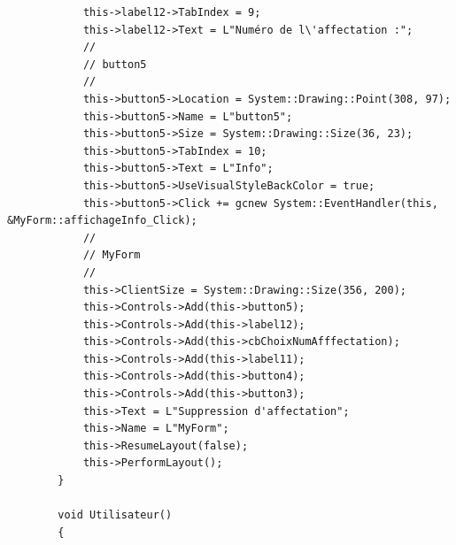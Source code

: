 \documentclass[main.tex]{subfiles}
\begin{document}
\begin{lstlisting}
			this->label12->TabIndex = 9;
			this->label12->Text = L"Numéro de l\'affectation :";
			// 
			// button5
			// 
			this->button5->Location = System::Drawing::Point(308, 97);
			this->button5->Name = L"button5";
			this->button5->Size = System::Drawing::Size(36, 23);
			this->button5->TabIndex = 10;
			this->button5->Text = L"Info";
			this->button5->UseVisualStyleBackColor = true;
			this->button5->Click += gcnew System::EventHandler(this, &MyForm::affichageInfo_Click);
			// 
			// MyForm
			// 
			this->ClientSize = System::Drawing::Size(356, 200);
			this->Controls->Add(this->button5);
			this->Controls->Add(this->label12);
			this->Controls->Add(this->cbChoixNumAfffectation);
			this->Controls->Add(this->label11);
			this->Controls->Add(this->button4);
			this->Controls->Add(this->button3);
			this->Text = L"Suppression d'affectation";
			this->Name = L"MyForm";
			this->ResumeLayout(false);
			this->PerformLayout();
		}

		void Utilisateur()
		{


\end{lstlisting}
\end{document}
